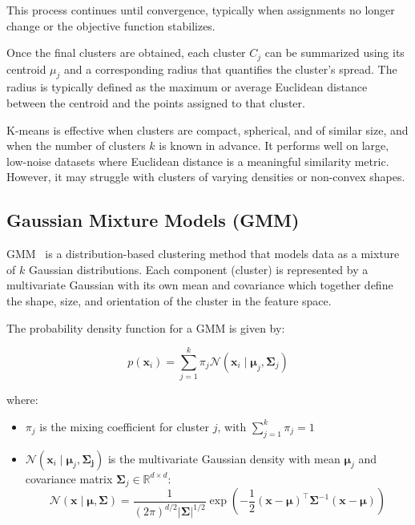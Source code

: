 This process continues until convergence, typically when assignments no longer
change or the objective function stabilizes.

Once the final clusters are obtained, each cluster $C_{j}$ can be summarized
using its centroid $\mu_j$ and a corresponding radius that quantifies the
cluster's spread. The radius is typically defined as the maximum or average
Euclidean distance between the centroid and the points assigned to that
cluster.

K-means is effective when clusters are compact, spherical, and of similar size,
and when the number of clusters $k$ is known in advance. It performs well on
large, low-noise datasets where Euclidean distance is a meaningful similarity
metric. However, it may struggle with clusters of varying densities or
non-convex shapes.

\subsection*{Gaussian Mixture Models (GMM)}

GMM~\cite{gaussian_mixtures} is a distribution-based clustering method that
models data as a mixture of $k$ Gaussian distributions. Each component
(cluster) is represented by a multivariate Gaussian with its own mean and
covariance which together define the shape, size, and orientation of the
cluster in the feature space.

The probability density function for a GMM is given by:

\begin{equation}
    p(\mathbf{x}_i) = \sum_{j=1}^{k} \pi_j \mathcal{N}(\mathbf{x}_i \mid \boldsymbol{\mu}_j, \mathbf{\mathbf{\Sigma}}_j)
\end{equation}

where:
\begin{itemize}
    \item $\pi_j$ is the mixing coefficient for cluster $j$, with $\sum_{j=1}^{k} \pi_j = 1$
    \item $\mathcal{N}(\mathbf{x}_i \mid \boldsymbol{\mu}_j, \mathbf{\mathbf{\Sigma}_j})$ is the multivariate Gaussian density with mean $\boldsymbol{\mu}_j$ and covariance matrix $\mathbf{\Sigma}_j \in \mathbb{R}^{d \times d}$:
          \begin{equation}
              \mathcal{N}(\mathbf{x} \mid \boldsymbol{\mu}, \mathbf{\Sigma}) = \frac{1}{(2\pi)^{d/2} |\mathbf{\Sigma}|^{1/2}}
              \exp \left( -\frac{1}{2}(\mathbf{x} - \boldsymbol{\mu})^\top \mathbf{\Sigma}^{-1} (\mathbf{x} - \boldsymbol{\mu}) \right)
          \end{equation}
\end{itemize}

